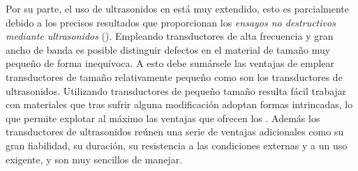 Por su parte, el uso de ultrasonidos en  está muy extendido, esto es parcialmente debido a los precisos resultados que proporcionan los \emph{ensayos no destructivos mediante ultrasonidos} (). Empleando transductores de alta frecuencia y gran ancho de banda es posible distinguir defectos en el material de tamaño muy pequeño de forma inequívoca. A esto debe sumársele las ventajas de emplear transductores de tamaño relativamente pequeño como son los transductores de ultrasonidos. Utilizando transductores de pequeño tamaño resulta fácil trabajar con materiales que tras sufrir alguna modificación adoptan formas intrincadas, lo que permite explotar al máximo las ventajas que ofrecen los . Además los transductores de ultrasonidos reúnen una serie de ventajas adicionales como su gran fiabilidad, su duración, su resistencia a las condiciones externas y a un uso exigente, y son muy sencillos de manejar.\par
